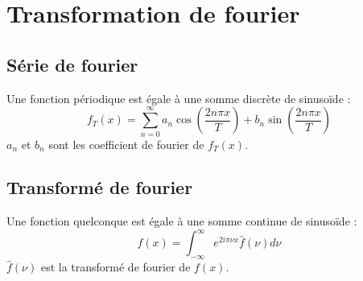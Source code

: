 
\chapter{Transformation de fourier}

\section{Série de fourier}
%
Une fonction périodique est égale à une somme discrète de sinusoïde :
\[
f_T(x)=\sum_{n=0}^\infty a_n \cos (\frac{2 n \pi x}{T}) + b_n \sin (\frac{2 n \pi x}{T})
\]
$a_n$ et $b_n$ sont les coefficient de fourier de $f_T(x)$.

\section{Transformé de fourier}
%
Une fonction quelconque est égale à une somme continue de sinusoïde :
\[
f(x) = \int_{-\infty}^\infty e^{2 i \pi \nu x}\widehat{f}(\nu) d\nu
\]
$\widehat{f}(\nu)$ est la transformé de fourier de $f(x)$.

